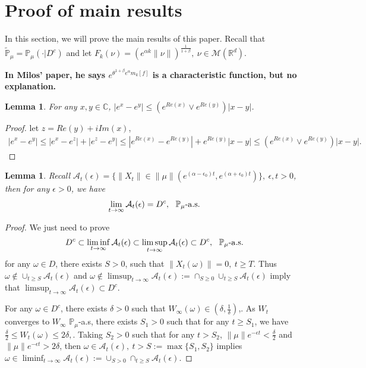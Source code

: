 \documentclass[12pt,oneside,english]{amsart}
\theoremstyle{plain}
\newtheorem{lem}[thm]{Lemma}
\theoremstyle{definition}
\numberwithin{equation}{section}
\begin{document}
\section{Proof of main results}

In this section, we will prove the main results of this paper. Recall that $\mathbb{\tilde{P}}_{\mu}=\mathbb{P}_{\mu}(\cdot|D^c)$ and let $F_k(\nu)=\left(e^{\alpha k}\|\nu\|\right)^{\frac{1}{1+\beta}},~ \nu\in \mathcal{M}(\mathbb{R}^d)$.

{\bf In Milos' paper, he says $e^{\theta^{1+\beta}e^{\alpha}m_k[f]}$ is a characteristic function, but no explanation.}
\begin{lem}\label{lemma31}
For any $x,y\in \mathbb{C}$, $|e^x-e^y|\leq (e^{Re(x)}\vee e^{Re(y)})|x-y|$.
\end{lem}
\begin{proof}
let $z=Re(y)+iIm(x)$,
\begin{align}\label{estim}
    |e^x-e^y|\leq|e^x-e^z|+|e^z-e^y|\leq |e^{Re(x)}-e^{Re(y)}|+e^{Re(y)}|x-y|\leq (e^{Re(x)}\vee e^{Re(y)})|x-y|.
\end{align}
\end{proof}
\begin{lem}\label{lemma32}
Recall $\mathcal{A}_t(\epsilon)=\{\|X_t\|\in\|\mu\|(e^{(\alpha-\epsilon_0)t},e^{(\alpha+\epsilon_0)t})\},~\epsilon,t>0$, then for any $\epsilon>0$, we have
\begin{align}
    \lim_{t\rightarrow\infty}\mathcal{A}_t(\epsilon)=D^c, ~~\mathbb{P}_{\mu}\text{-}{\rm a.s}.
\end{align}
\end{lem}
\begin{proof}
    We just need to prove
    \begin{align}
        D^c \subset \liminf_{t\rightarrow\infty}\mathcal{A}_t(\epsilon)\subset \limsup_{t\rightarrow\infty}\mathcal{A}_t(\epsilon)\subset D^c,~~\mathbb{P}_{\mu}\text{-}{\rm a.s}.
    \end{align}
    for any $\omega\in D$, there exists $S>0$, such that $\|X_t(\omega)\|=0,~t\geq T$. Thus $\omega \notin \cup_{t\geq S}\mathcal{A}_t(\epsilon)$ and $\omega\notin  \limsup_{t\rightarrow\infty}\mathcal{A}_t(\epsilon):=\cap_{S\geq 0}\cup_{t\geq S}\mathcal{A}_t(\epsilon)$ imply that $\limsup_{t\rightarrow\infty}\mathcal{A}_t(\epsilon)\subset D^c$.

    For any $\omega \in D^c$, there exists $\delta>0$ such that $W_{\infty}(\omega)\in(\delta,\frac{1}{\delta})$,. As $W_t$ converges to $W_{\infty}$ $\mathbb{P}_{\mu}$-a.s, there exists $S_1>0$ such that for any $t\geq S_1$, we have $\frac{\delta}{2}\leq W_t(\omega)\leq 2\delta,$. Taking $S_2>0$ such that for any $t>S_2$, $\|\mu\|e^{-\epsilon t}<\frac{\delta}{2}$ and $\|\mu\|e^{-\epsilon t}>2\delta$, then $\omega\in \mathcal{A}_t(\epsilon),~t>S:=\max\{S_1,S_2\}$ implies $\omega \in \liminf_{t\rightarrow \infty}\mathcal{A}_t(\epsilon):=\cup_{S>0}\cap_{t\geq S}\mathcal{A}_t(\epsilon)$.
\end{proof}
\end{document}
